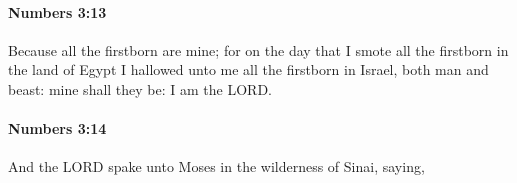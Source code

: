 		\paragraph{Numbers 3:13} %
			\label{NUMBERS-3-13}

			Because all the firstborn are mine; for on the day that I smote all the firstborn in the land of Egypt I hallowed unto me all the firstborn in Israel, both man and beast: mine shall they be: I am the LORD.


		\paragraph{Numbers 3:14} %
			\label{NUMBERS-3-14}

			And the LORD spake unto Moses in the wilderness of Sinai, saying,


